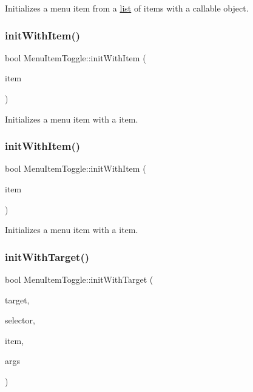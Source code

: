 Initializes a menu item from a \hyperlink{protocollist-p}{list} of items with a callable object. \mbox{\label{classMenuItemToggle_a1b066217b51ba2f276faf2278ef969ae}} 
\subsubsection{\texorpdfstring{init\+With\+Item()}{initWithItem()}\hspace{0.1cm}{\footnotesize\ttfamily [1/2]}}
{\footnotesize\ttfamily bool Menu\+Item\+Toggle\+::init\+With\+Item (\begin{DoxyParamCaption}\item[{\hyperlink{classMenuItem}{Menu\+Item} $\ast$}]{item }\end{DoxyParamCaption})}

Initializes a menu item with a item. \mbox{\label{classMenuItemToggle_a1b066217b51ba2f276faf2278ef969ae}} 
\subsubsection{\texorpdfstring{init\+With\+Item()}{initWithItem()}\hspace{0.1cm}{\footnotesize\ttfamily [2/2]}}
{\footnotesize\ttfamily bool Menu\+Item\+Toggle\+::init\+With\+Item (\begin{DoxyParamCaption}\item[{\hyperlink{classMenuItem}{Menu\+Item} $\ast$}]{item }\end{DoxyParamCaption})}

Initializes a menu item with a item. \mbox{\label{classMenuItemToggle_a21c50a3c08483970a8e8e322fa9bdb8f}} 
\subsubsection{\texorpdfstring{init\+With\+Target()}{initWithTarget()}\hspace{0.1cm}{\footnotesize\ttfamily [1/2]}}
{\footnotesize\ttfamily bool Menu\+Item\+Toggle\+::init\+With\+Target (\begin{DoxyParamCaption}\item[{\hyperlink{classRef}{Ref} $\ast$}]{target,  }\item[{S\+E\+L\+\_\+\+Menu\+Handler}]{selector,  }\item[{\hyperlink{classMenuItem}{Menu\+Item} $\ast$}]{item,  }\item[{va\+\_\+list}]{args }\end{DoxyParamCaption})}

